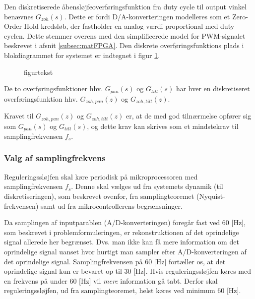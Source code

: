 Den diskretiserede åbensløjfeoverføringsfunktion fra duty cycle til output vinkel
benævnes \(G_{zoh}\left(s\right)\). Dette er fordi D/A-konverteringen modelleres som et Zero-Order Hold kredsløb,
der fastholder en analog værdi proportional med duty cyclen. Dette stemmer overens med den simplificerede
model for PWM-signalet beskrevet i afsnit \ref{subsec:matFPGA}.
Den diskrete overføringsfunktions plads i blokdiagrammet for systemet
er indtegnet i figur \ref{fig:digitalkontroller3}.
\begin{figure}[!th]
\centering
\begin{tikzpicture}[auto, node distance=2.6cm,>=latex']

\end{tikzpicture}
\caption[tekst i indholdsfortegnelsen]{figurtekst}
\label{fig:digitalkontroller3}
\end{figure}
De to overføringsfunktioner hhv. \(G_{pan}\left(s\right)\) og \(G_{tilt}\left(s\right)\)
har hver en diskretiseret overføringsfunktion hhv. \(G_{zoh,pan}\left(z\right)\) og \(G_{zoh,tilt}\left(z\right)\).

Kravet til \(G_{zoh,pan}\left(z\right)\) og \(G_{zoh,tilt}\left(z\right)\) er, at de
med god tilnærmelse opfører sig som \(G_{pan}\left(s\right)\) og \(G_{tilt}\left(s\right)\),
og dette krav kan skrives som et mindstekrav til samplingfrekvensen \(f_s\).

\subsubsection{Valg af samplingfrekvens}
\label{subsec:choosefs}
Reguleringssløjfen skal køre periodisk på mikroprocessoren
med samplingfrekvensen \(f_s\). Denne skal vælges
ud fra systemets dynamik (til diskretiseringen), som beskrevet ovenfor,
fra samplingteoremet (Nyquist-frekvensen) samt ud fra
mikrocontrollerens begrænsninger.

Da samplingen af inputparablen (A/D-konverteringen) foregår fast ved 60 [Hz],
som beskrevet i problemformuleringen, er rekonstruktionen
af det oprindelige signal allerede her begrænset. Dvs. man
ikke kan få mere information om det oprindelige signal
uanset hvor hurtigt man sampler efter A/D-konverteringen af
det oprindelige signal.
Samplingfrekvensen på 60 [Hz] fortæller os,
at det oprindelige signal kun er bevaret op til 30 [Hz].
Hvis reguleringssløjfen køres med en frekvens på under 60 [Hz]
vil \textit{mere} information gå tabt.
Derfor skal reguleringssløjfen, ud fra samplingteoremet, helst køres
ved minimum 60 [Hz].


